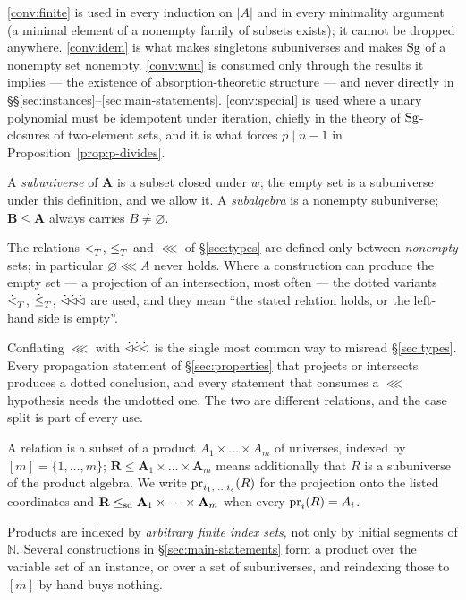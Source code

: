 \begin{hazard}\label{haz:hyp-audit}
\ref{conv:finite} is used in every induction on $|A|$ and in every
minimality argument (a minimal element of a nonempty family of subsets
exists); it cannot be dropped anywhere. \ref{conv:idem} is what makes
singletons subuniverses and makes $\operatorname{Sg}$ of a nonempty set nonempty.
\ref{conv:wnu} is consumed only through the results it implies --- the
existence of absorption-theoretic structure --- and never directly in
\S\S\ref{sec:instances}--\ref{sec:main-statements}. \ref{conv:special} is used
where a unary polynomial must be idempotent under iteration, chiefly in the
theory of $\operatorname{Sg}$-closures of two-element sets, and it is what forces
$p\mid n-1$ in Proposition~\ref{prop:p-divides}.
\end{hazard}

\begin{convention}\label{conv:empty}
A \emph{subuniverse} of $\mathbf A$ is a subset closed under $w$; the empty set
is a subuniverse under this definition, and we allow it. A
\emph{subalgebra} is a nonempty subuniverse; $\mathbf B\le\mathbf A$ always
carries $B\neq\varnothing$.

The relations $<_{T}^{}$, $\le_{T}^{}$ and $\lll$ of \S\ref{sec:types} are
defined only between \emph{nonempty} sets; in particular
$\varnothing\lll A$ never holds. Where a construction can produce the empty
set --- a projection of an intersection, most often --- the dotted variants
$\dot<_{T}^{}$, $\dot\le_{T}^{}$, $\mathrel{\dot{\lhd}\!\dot{\lhd}\!\dot{\lhd}}$ are used, and they mean ``the stated relation
holds, or the left-hand side is empty''.
\end{convention}

\begin{hazard}\label{haz:dot}
Conflating $\lll$ with $\mathrel{\dot{\lhd}\!\dot{\lhd}\!\dot{\lhd}}$ is the single most common way to misread
\S\ref{sec:types}. Every propagation statement of \S\ref{sec:properties} that
projects or intersects produces a dotted conclusion, and every statement that
consumes a $\lll$ hypothesis needs the undotted one. The two are different
relations, and the case split is part of every use.
\end{hazard}

\begin{convention}\label{conv:relations}
A relation is a subset of a product $A_{1}\times\dots\times A_{m}$ of universes,
indexed by $[m]=\{1,\dots,m\}$; $\mathbf R\le\mathbf A_{1}\times\dots\times
\mathbf A_{m}$ means additionally that $R$ is a subuniverse of the product
algebra. We write $\operatorname*{pr}_{i_{1},\dots,i_{s}}(R)$ for the projection onto the
listed coordinates and $\mathbf R\le_{\mathrm{sd}}\mathbf A_{1}\times\dots\times\mathbf
A_{m}$ when every $\operatorname*{pr}_{i}(R)=A_{i}$.

Products are indexed by \emph{arbitrary finite index sets}, not only by initial
segments of $\mathbb N$. Several constructions in \S\ref{sec:main-statements}
form a product over the variable set of an instance, or over a set of
subuniverses, and reindexing those to $[m]$ by hand buys nothing.
\end{convention}

